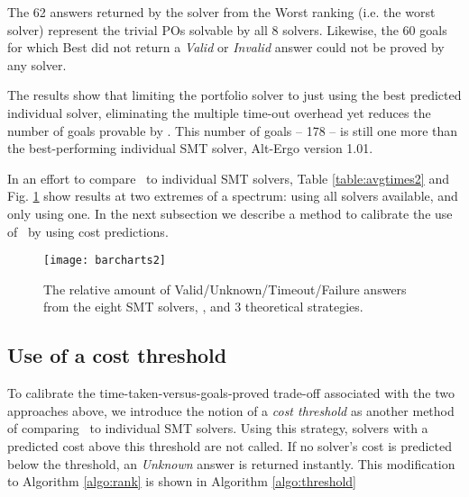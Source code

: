 The 62  answers returned by the solver from the \textsf{Worst} ranking (i.e. the worst solver) represent the trivial POs solvable by all 8 solvers. 
Likewise, the 60 goals for which \textsf{Best} did not return a \textit{Valid} or \textit{Invalid} answer could not be proved by any solver.

The results show that limiting the portfolio solver to just using the best predicted individual solver, eliminating the multiple time-out overhead yet reduces the number of goals provable by \where.
This number of goals -- 178 -- is still one more than the best-performing individual SMT solver, Alt-Ergo version 1.01.  

In an effort to compare \where~to individual SMT solvers, Table \ref{table:avgtimes2} and Fig. \ref{fig:barchart2} show results at two extremes of a spectrum: using all solvers available, and only using one.
In the next subsection we describe a method to calibrate the use of \where~by using cost predictions. 

\begin{figure}
	\centering
	\texttt{[image: barcharts2]}
	\caption[The relative amount of Valid/Unknown/Timeout/Failure answers from the eight SMT solvers, \where, and 3 theoretical strategies.]{The relative amount of Valid/Unknown/Timeout/Failure answers from the eight SMT solvers, \where, and 3 theoretical strategies.}
	\label{fig:barchart2}
\end{figure}

\subsection{Use of a cost threshold}

To calibrate the time-taken-versus-goals-proved trade-off associated with the two approaches above, we introduce the notion of a \textit{cost threshold} as another method of comparing \where~to individual SMT solvers.
Using this strategy, solvers with a predicted cost above this threshold are not called. 
If no solver's cost is predicted below the threshold, an \textit{Unknown} answer is returned instantly.
This modification to Algorithm \ref{algo:rank} is shown in Algorithm \ref{algo:threshold}    

